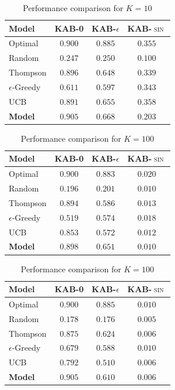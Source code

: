 \begin{table}[H]
\centering
\caption{Performance comparison for $K=10$}
\label{tab:k10}
\begin{tabular}{l c c c}
\toprule
\textbf{Model} & \textbf{\textsc{KAB-0}} & \textbf{\textsc{KAB-$\epsilon$}} & \textbf{\textsc{KAB-$\sin$}} \\
\midrule
Optimal & $0.900$ & $0.885$ & $0.355$  \\
Random & $0.247$ & $0.250$ & $0.100$ \\
\midrule
Thompson & $0.896$ & $0.648$ & $0.339$ \\

$\epsilon$-Greedy & $0.611$ & $0.597$ & $0.343$ \\
UCB & $0.891$ & $0.655$ & $0.358$ \\
\textbf{Model} & $\mathbf{0.905}$ & $\mathbf{0.668}$ & $\mathbf{0.203}$  \\
\bottomrule
\end{tabular}
\end{table}

\begin{table}[H]
\centering
\caption{Performance comparison for $K=100$}
\label{tab:k100}
\begin{tabular}{l c c c}
\toprule
\textbf{Model} & \textbf{\textsc{KAB-0}} & \textbf{\textsc{KAB-$\epsilon$}} & \textbf{\textsc{KAB-$\sin$}} \\
\midrule
Optimal & $0.900$ & $0.883$ & $0.020$  \\
Random & $0.196$ & $0.201$ & $0.010$ \\
\midrule
Thompson & $0.894$ & $0.586$ & $0.013$ \\
$\epsilon$-Greedy & $0.519$ & $0.574$ & $0.018$ \\
UCB & $0.853$ & $0.572$ & $0.012$ \\
\textbf{Model} & $\mathbf{0.898}$ & $\mathbf{0.651}$ & $\mathbf{0.010}$  \\
\bottomrule
\end{tabular}
\end{table}

\begin{table}[H]
\centering
\caption{Performance comparison for $K=100$}
\label{tab:k200}
\begin{tabular}{l c c c}
\toprule
\textbf{Model} & \textbf{\textsc{KAB-0}} & \textbf{\textsc{KAB-$\epsilon$}} & \textbf{\textsc{KAB-$\sin$}} \\
\midrule
Optimal & $0.900$ & $0.885$ & $0.010$  \\
Random & $0.178$ & $0.176$ & $0.005$ \\
\midrule
Thompson & $0.875$ & $0.624$ & $0.006$ \\
$\epsilon$-Greedy & $0.679$ & $0.588$ & $0.010$ \\
UCB & $0.792$ & $0.510$ & $0.006$ \\
\textbf{Model} & $\mathbf{0.905}$ & $\mathbf{0.610}$ & $\mathbf{0.006}$  \\
\bottomrule
\end{tabular}
\end{table}

